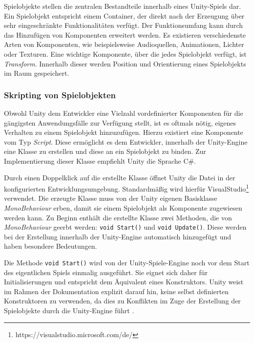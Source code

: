 Spielobjekte stellen die zentralen Bestandteile innerhalb eines Unity-Spiels dar. Ein Spielobjekt entspricht einem Container, der direkt nach der Erzeugung über sehr eingeschränkte Funktionalitäten verfügt. Der Funktionsumfang kann durch das Hinzufügen von Komponenten erweitert werden. Es existieren verschiedenste Arten von Komponenten, wie beispielsweise Audioquellen, Animationen, Lichter oder Texturen. Eine wichtige Komponente, über die jedes Spielobjekt verfügt, ist \textit{Transform}. Innerhalb dieser werden Position und Orientierung eines Spielobjekts im Raum gespeichert. 


\subsubsection{Skripting von Spielobjekten}\label{sec:unityScripting}

Obwohl Unity dem Entwickler eine Vielzahl vordefinierter Komponenten für die gängigsten Anwendungsfälle zur Verfügung stellt, ist es oftmals nötig, eigenes Verhalten zu einem Spielobjekt hinzuzufügen. Hierzu existiert eine Komponente vom Typ \textit{Script}. Diese ermöglicht es dem Entwickler, innerhalb der Unity-Engine eine Klasse zu erstellen und diese an ein Spielobjekt zu binden. Zur Implementierung dieser Klasse empfiehlt Unity die Sprache C\#.

Durch einen Doppelklick auf die erstellte Klasse öffnet Unity die Datei in der konfigurierten Entwicklungsumgebung. Standardmäßig wird hierfür VisualStudio\footnote{https://visualstudio.microsoft.com/de/} verwendet. Die erzeugte Klasse muss von der Unity eigenen Basisklasse \textit{MonoBehaviour} erben, damit sie einem Spielobjekt als Komponente zugewiesen werden kann. Zu Beginn enthält die erstellte Klasse zwei Methoden, die von \textit{MonoBehaviour} geerbt werden: \texttt{void Start()} und \texttt{void Update()}. Diese werden bei der Erstellung innerhalb der Unity-Engine automatisch hinzugefügt und haben besondere Bedeutungen.

Die Methode \texttt{void Start()} wird von der Unity-Spiele-Engine noch vor dem Start des eigentlichen Spiels einmalig ausgeführt. Sie eignet sich daher für Initialisierungen und entspricht dem Äquivalent eines Konstruktors. Unity weist im Rahmen der Dokumentation explizit darauf hin, keine selbst definierten Konstruktoren zu verwenden, da dies zu Konflikten im Zuge der Erstellung der Spielobjekte durch die Unity-Engine führt \cite{Unity_Doc_Creating_and_Using_Scripts}. 

